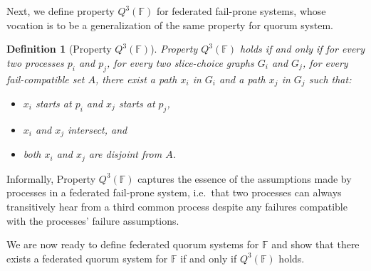 \documentclass[11pt]{article}
\newtheorem{definition}{Definition}
\begin{document}
Next, we define property $Q^3(\mathbb{F})$ for federated fail-prone systems, whose vocation is to be a generalization of the same property for quorum system.
\begin{definition}[Property $Q^3(\mathbb{F})$]
  Property $Q^3(\mathbb{F})$ holds if and only if for every two processes $p_i$ and $p_j$, for every two slice-choice graphs $G_i$ and $G_j$, for every fail-compatible set $A$, there exist a path $x_i$ in $G_i$ and a path $x_j$ in $G_j$ such that:
  \begin{itemize}
    \item $x_i$ starts at $p_i$ and $x_j$ starts at $p_j$,
    \item $x_i$ and $x_j$ intersect, and
    \item both $x_i$ and $x_j$ are disjoint from $A$.
  \end{itemize}
\end{definition}

Informally, Property $Q^3(\mathbb{F})$ captures the essence of the assumptions made by processes in a federated fail-prone system, i.e.\ that two processes can always transitively hear from a third common process despite any failures compatible with the processes' failure assumptions.


We are now ready to define federated quorum systems for $\mathbb{F}$ and show that there exists a federated quorum system for $\mathbb{F}$ if and only if $Q^3(\mathbb{F})$ holds.
\end{document}
